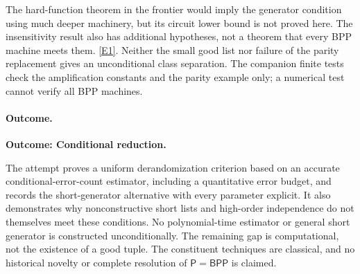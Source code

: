 \documentclass[11pt,a4paper]{article}
\newcommand{\eref}[2]{\hyperlink{extra:#1:#2}{[E#2]}}
\numberwithin{equation}{section}
\begin{document}
The hard-function theorem in the frontier would imply the generator
condition using much deeper machinery, but its circuit lower bound is
not proved here. The insensitivity result also has additional hypotheses,
not a theorem that every BPP machine meets them. \eref{statement}{1}.
Neither the small good list nor failure of the parity replacement gives
an unconditional class separation. The companion finite tests check the
amplification constants and the parity example only; a numerical test
cannot verify all BPP machines.

\paragraph{Outcome.}
\textbf{Outcome: Conditional reduction.}

The attempt proves a uniform derandomization criterion based on an
accurate conditional-error-count estimator, including a quantitative
error budget, and records the short-generator alternative with every
parameter explicit. It also demonstrates why nonconstructive short lists
and high-order independence do not themselves meet these conditions.
No polynomial-time estimator or general short generator is constructed
unconditionally. The remaining gap is computational, not the existence
of a good tuple. The constituent techniques are classical, and no
historical novelty or complete resolution of $\mathsf P=\mathsf{BPP}$
is claimed.

\end{document}
